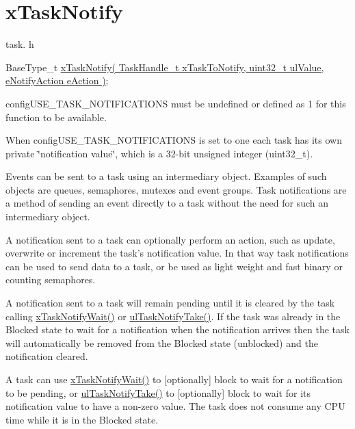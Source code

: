 \hypertarget{group__xTaskNotify}{\section{x\-Task\-Notify}
\label{group__xTaskNotify}
}
task. h 
\begin{DoxyPre}BaseType\_t \hyperlink{task_8h_a0d2d54fb8a64011dfbb54983e4ed06bd}{xTaskNotify( TaskHandle\_t xTaskToNotify, uint32\_t ulValue, eNotifyAction eAction )};\end{DoxyPre}


config\-U\-S\-E\-\_\-\-T\-A\-S\-K\-\_\-\-N\-O\-T\-I\-F\-I\-C\-A\-T\-I\-O\-N\-S must be undefined or defined as 1 for this function to be available.

When config\-U\-S\-E\-\_\-\-T\-A\-S\-K\-\_\-\-N\-O\-T\-I\-F\-I\-C\-A\-T\-I\-O\-N\-S is set to one each task has its own private \char`\"{}notification value\char`\"{}, which is a 32-\/bit unsigned integer (uint32\-\_\-t).

Events can be sent to a task using an intermediary object. Examples of such objects are queues, semaphores, mutexes and event groups. Task notifications are a method of sending an event directly to a task without the need for such an intermediary object.

A notification sent to a task can optionally perform an action, such as update, overwrite or increment the task's notification value. In that way task notifications can be used to send data to a task, or be used as light weight and fast binary or counting semaphores.

A notification sent to a task will remain pending until it is cleared by the task calling \hyperlink{task_8h_a0475fcda9718f403521c270a7270ff93}{x\-Task\-Notify\-Wait()} or \hyperlink{task_8h_a66540bef602522a01a519f776e4c07d8}{ul\-Task\-Notify\-Take()}. If the task was already in the Blocked state to wait for a notification when the notification arrives then the task will automatically be removed from the Blocked state (unblocked) and the notification cleared.

A task can use \hyperlink{task_8h_a0475fcda9718f403521c270a7270ff93}{x\-Task\-Notify\-Wait()} to \mbox{[}optionally\mbox{]} block to wait for a notification to be pending, or \hyperlink{task_8h_a66540bef602522a01a519f776e4c07d8}{ul\-Task\-Notify\-Take()} to \mbox{[}optionally\mbox{]} block to wait for its notification value to have a non-\/zero value. The task does not consume any C\-P\-U time while it is in the Blocked state.

